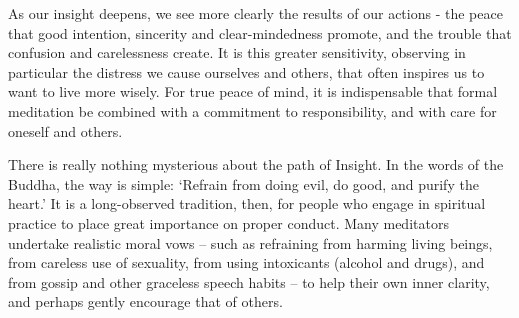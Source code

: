 
As our insight deepens, we see more clearly the results of our actions -
the peace that good intention, sincerity and clear-mindedness promote,
and the trouble that confusion and carelessness create. It is this
greater sensitivity, observing in particular the distress we cause
ourselves and others, that often inspires us to want to live more
wisely. For true peace of mind, it is indispensable that formal
meditation be combined with a commitment to responsibility, and with
care for oneself and others.

There is really nothing mysterious about the path of Insight. In the
words of the Buddha, the way is simple: `Refrain from doing
evil, do good, and purify the heart.' It is a long-observed tradition, then, for
people who engage in spiritual practice to place great importance on
proper conduct. Many meditators undertake realistic moral vows -- such as
refraining from harming living beings, from careless use of sexuality,
from using intoxicants (alcohol and drugs), and from gossip and other
graceless speech habits -- to help their own inner clarity, and perhaps
gently encourage that of others.
